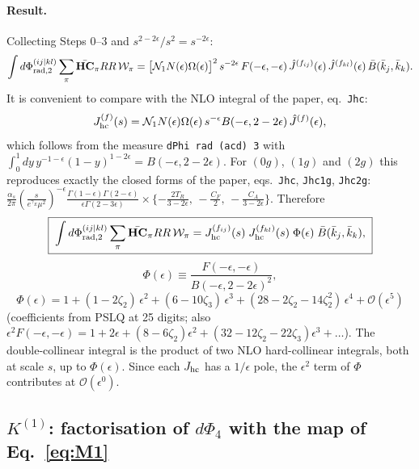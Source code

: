 \documentclass[11pt,a4paper]{article}
\newcommand{\bbHC}[1]{\bar{\mathbf{HC}}_{#1}}
\newcommand{\RR}{RR}
\newcommand{\W}[1]{\mathcal W_{#1}}
\newcommand{\jb}{\bar k_{j}}
\newcommand{\kb}{\bar k_{k}}
\newcommand{\eps}{\epsilon}
\begin{document}
\paragraph{Result.} Collecting Steps 0--3 and $s^{2-2\eps}/s^2=s^{-2\eps}$:
\begin{equation}
\int d\Phi^{(ij|kl)}_{{\rm rad},2}\sum_\pi\bbHC{\pi}\RR\,\W{\pi}
=\big[\mathcal N_1N(\eps)\Omega(\eps)\big]^2\,s^{-2\eps}\,F(-\eps,-\eps)\,\hat J^{(f_{ij})}(\eps)\,\hat J^{(f_{kl})}(\eps)\,\bar B(\jb,\kb).
\end{equation}
It is convenient to compare with the NLO integral of the paper, eq.~\texttt{Jhc}:
\begin{equation}
J^{(f)}_{\rm hc}(s)=\mathcal N_1N(\eps)\Omega(\eps)\,s^{-\eps}B(-\eps,2-2\eps)\,\hat J^{(f)}(\eps),
\end{equation}
which follows from the measure \texttt{dPhi rad (acd) 3} with $\int_0^1dy\,y^{-1-\eps}(1-y)^{1-2\eps}=B(-\eps,2-2\eps)$.
For $(0g)$, $(1g)$ and $(2g)$ this reproduces exactly the closed forms of the paper, eqs.~\texttt{Jhc}, \texttt{Jhc1g}, \texttt{Jhc2g}: $\frac{\alpha_s}{2\pi}(\frac{s}{e^{\gamma_E}\mu^2})^{-\eps}\frac{\Gamma(1-\eps)\Gamma(2-\eps)}{\eps\Gamma(2-3\eps)}\times\{-\frac{2T_R}{3-2\eps},\,-\frac{C_F}{2},\,-\frac{C_A}{3-2\eps}\}$.
Therefore
\begin{equation}
\boxed{\;
\int d\Phi^{(ij|kl)}_{{\rm rad},2}\sum_\pi\bbHC{\pi}\RR\,\W{\pi}
=J^{(f_{ij})}_{\rm hc}(s)\;J^{(f_{kl})}_{\rm hc}(s)\;\Phi(\eps)\;\bar B(\jb,\kb),\;}
\end{equation}
\begin{equation}
\Phi(\eps)\equiv\frac{F(-\eps,-\eps)}{B(-\eps,2-2\eps)^2},
\label{eq:intCijkl}
\end{equation}
\begin{equation}
\Phi(\eps)=1+(1-2\zeta_2)\,\eps^2+(6-10\zeta_3)\,\eps^3+(28-2\zeta_2-14\zeta_2^2)\,\eps^4+\mathcal O(\eps^5)
\end{equation}
(coefficients from PSLQ at 25 digits; also $\eps^2F(-\eps,-\eps)=1+2\eps+(8-6\zeta_2)\eps^2+(32-12\zeta_2-22\zeta_3)\eps^3+\dots$).
The double-collinear integral is the product of two NLO hard-collinear integrals, both at scale $s$, up to $\Phi(\eps)$.
Since each $J_{\rm hc}$ has a $1/\eps$ pole, the $\eps^2$ term of $\Phi$ contributes at $\mathcal O(\eps^0)$.

\subsection{$K^{(1)}$: factorisation of $d\Phi_4$ with the map of Eq.~\eqref{eq:M1}}
\label{sec:psK1}
\end{document}
